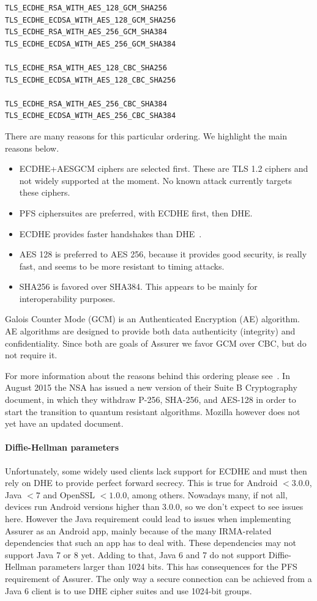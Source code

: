 \begin{verbatim}
TLS_ECDHE_RSA_WITH_AES_128_GCM_SHA256
TLS_ECDHE_ECDSA_WITH_AES_128_GCM_SHA256
TLS_ECDHE_RSA_WITH_AES_256_GCM_SHA384
TLS_ECDHE_ECDSA_WITH_AES_256_GCM_SHA384

TLS_ECDHE_RSA_WITH_AES_128_CBC_SHA256
TLS_ECDHE_ECDSA_WITH_AES_128_CBC_SHA256

TLS_ECDHE_RSA_WITH_AES_256_CBC_SHA384
TLS_ECDHE_ECDSA_WITH_AES_256_CBC_SHA384
\end{verbatim}

There are many reasons for this particular ordering. We highlight the main reasons below. 

\begin{itemize}
  \item ECDHE+AESGCM ciphers are selected first. These are TLS 1.2 ciphers and not widely supported at the moment. No known attack currently targets these ciphers.
  \item PFS ciphersuites are preferred, with ECDHE first, then DHE.
	\item ECDHE provides faster handshakes than DHE~\cite{bernat2011ssl,pfsprice}.
  \item AES 128 is preferred to AES 256, because it provides good security, is really fast, and seems to be more resistant to timing attacks.
  \item SHA256 is favored over SHA384. This appears to be mainly for interoperability purposes.
\end{itemize}

Galois Counter Mode (GCM) is an Authenticated Encryption (AE) algorithm. AE algorithms are designed to provide both data authenticity (integrity) and confidentiality. Since both are goals of Assurer we favor GCM over CBC, but do not require it.

For more information about the reasons behind this ordering please see~\cite{mozilla}. In August 2015 the NSA has issued a new version of their Suite B Cryptography document, in which they withdraw P-256, SHA-256, and AES-128 in order to start the transition to quantum resistant algorithms. Mozilla however does not yet have an updated document.

\paragraph{Diffie-Hellman parameters}
Unfortunately, some widely used clients lack support for ECDHE and must then rely on DHE to provide perfect forward secrecy. This is true for Android $< 3.0.0$, Java $< 7$ and OpenSSL $< 1.0.0$, among others. Nowadays many, if not all, devices run Android versions higher than 3.0.0, so we don't expect to see issues here. However the Java requirement could lead to issues when implementing Assurer as an Android app, mainly because of the many IRMA-related dependencies that such an app has to deal with. These dependencies may not support Java 7 or 8 yet. Adding to that, Java 6 and 7 do not support Diffie-Hellman parameters larger than 1024 bits. This has consequences for the PFS requirement of Assurer. The only way a secure connection can be achieved from a Java 6 client is to use DHE cipher suites and use 1024-bit groups.


